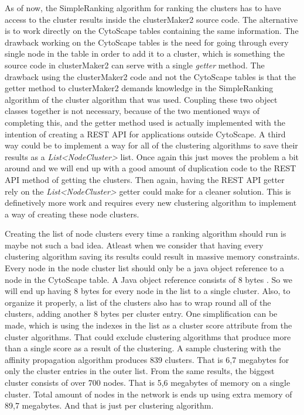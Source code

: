 \documentclass[UKenglish]{ifimaster}
\begin{document}
As of now, the SimpleRanking algorithm for ranking the clusters has to have
access to the cluster results inside the clusterMaker2 source code. The
alternative is to work directly on the CytoScape tables containing the same
information. The drawback working on the CytoScape tables is the need for going
through every single node in the table in order to add it to a cluster, which is
something the source code in clusterMaker2 can serve with a single
\textit{getter} method. The drawback using the clusterMaker2 code and not the
CytoScape tables is that the getter method to clusterMaker2 demands knowledge in
the SimpleRanking algorithm of the cluster algorithm that was used. Coupling
these two object classes together is not necessary, because of the two mentioned
ways of completing this, and the getter method used is actually implemented with
the intention of creating a REST API \cite{rest-api} for applications outside
CytoScape. A third way could be to implement a way for all of the clustering
algorithms to save their results as a \textit{List<NodeCluster>} list. Once
again this just moves the problem a bit around and we will end up with a good
amount of duplication code to the REST API method of getting the clusters. Then
again, having the REST API getter rely on the \textit{List<NodeCluster>} getter
could make for a cleaner solution. This is definetively more work and requires
every new clustering algorithm to implement a way of creating these node
clusters.

Creating the list of node clusters every time a ranking algorithm should run is
maybe not such a bad idea. Atleast when we consider that having every clustering
algorithm saving its results could result in massive memory constraints. Every
node in the node cluster list should only be a java object reference to a node
in the CytoScape table. A Java object reference consists of 8 bytes
\cite{java-reference-size}. So we will end up having 8 bytes for every node in
the list to a single cluster. Also, to organize it properly, a list of the
clusters also has to wrap round all of the clusters, adding another 8 bytes per
cluster entry. One simplification can be made, which is using the indexes in the
list as a cluster score attribute from the cluster algorithms. That could
exclude clustering algorithms that produce more than a single score as a result
of the clustering. A sample clustering with the affinity propagation algorithm
produces 839 clusters. That is 6,7 megabytes for only the cluster entries in the
outer list. From the same results, the biggest cluster consists of over 700
nodes. That is 5,6 megabytes of memory on a single cluster. Total amount of
nodes in the network is ends up using extra memory of 89,7 megabytes. And that
is just per clustering algorithm.
\end{document}
